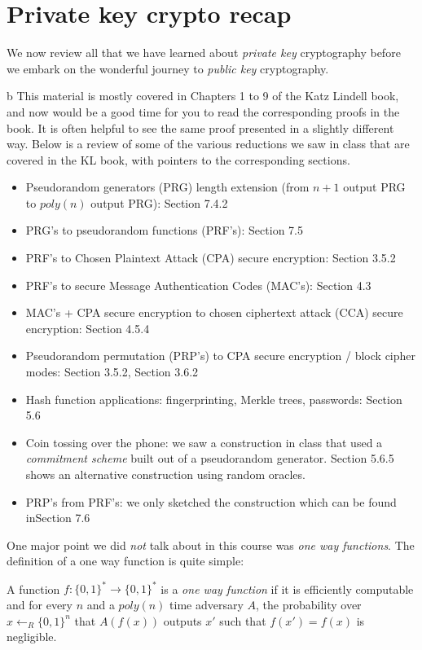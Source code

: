 \chapter{Private key crypto recap}\label{Private-key-crypto-recap}

We now review all that we have learned about \emph{private key}
cryptography before we embark on the wonderful journey to \emph{public
key} cryptography.

b This material is mostly covered in Chapters 1 to 9 of the Katz Lindell
book, and now would be a good time for you to read the corresponding
proofs in the book. It is often helpful to see the same proof presented
in a slightly different way. Below is a review of some of the various
reductions we saw in class that are covered in the KL book, with
pointers to the corresponding sections.

\begin{itemize}
\tightlist
\item
  Pseudorandom generators (PRG) length extension (from \(n+1\) output
  PRG to \(poly(n)\) output PRG): Section 7.4.2
\item
  PRG's to pseudorandom functions (PRF's): Section 7.5
\item
  PRF's to Chosen Plaintext Attack (CPA) secure encryption: Section
  3.5.2
\item
  PRF's to secure Message Authentication Codes (MAC's): Section 4.3
\item
  MAC's + CPA secure encryption to chosen ciphertext attack (CCA) secure
  encryption: Section 4.5.4
\item
  Pseudorandom permutation (PRP's) to CPA secure encryption / block
  cipher modes: Section 3.5.2, Section 3.6.2
\item
  Hash function applications: fingerprinting, Merkle trees, passwords:
  Section 5.6
\item
  Coin tossing over the phone: we saw a construction in class that used
  a \emph{commitment scheme} built out of a pseudorandom generator.
  Section 5.6.5 shows an alternative construction using random oracles.
\item
  PRP's from PRF's: we only sketched the construction which can be found
  inSection 7.6
\end{itemize}

One major point we did \emph{not} talk about in this course was
\emph{one way functions}. The definition of a one way function is quite
simple:

A function \(f:\{0,1\}^*\rightarrow\{0,1\}^*\) is a \emph{one way
function} if it is efficiently computable and for every \(n\) and a
\(poly(n)\) time adversary \(A\), the probability over
\(x\leftarrow_R\{0,1\}^n\) that \(A(f(x))\) outputs \(x'\) such that
\(f(x')=f(x)\) is negligible.

